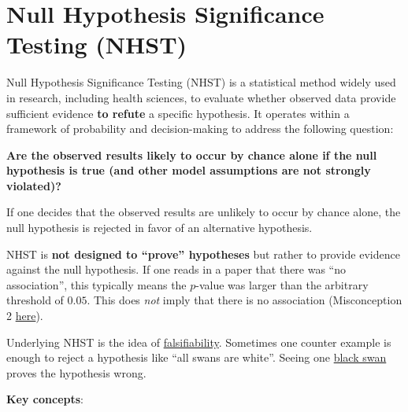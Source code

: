\documentclass[
]{book}
\begin{document}
\chapter{Null Hypothesis Significance Testing (NHST)}\label{nhst}

Null Hypothesis Significance Testing (NHST) is a statistical method widely used in research,
including health sciences, to evaluate whether observed data provide sufficient evidence \textbf{to refute} a specific hypothesis.
It operates within a framework of probability and decision-making to address the following question:

\textbf{Are the observed results likely to occur by chance alone if the null hypothesis is true (and other model assumptions are not strongly violated)?}

If one decides that the observed results are unlikely to occur by chance alone,
the null hypothesis is rejected in favor of an alternative hypothesis.

NHST is \textbf{not designed to ``prove'' hypotheses} but rather to provide evidence against the null hypothesis.
If one reads in a paper that there was ``no association'', this typically means the
\(p\)-value was larger than the arbitrary threshold of \(0.05\). This does \emph{not} imply that
there is no association (Misconception 2 \href{https://sixsigmadsi.com/wp-content/uploads/2020/10/A-Dirty-Dozen-Twelve-P-Value-Misconceptions.pdf}{here}).

Underlying NHST is the idea of \href{https://en.wikipedia.org/wiki/Falsifiability}{falsifiability}.
Sometimes one counter example is enough to reject a hypothesis like ``all swans are white''.
Seeing one \href{https://en.wikipedia.org/wiki/Falsifiability\#/media/File:Black_Swans.jpg}{black swan}
proves the hypothesis wrong.

\textbf{Key concepts}:
\end{document}
